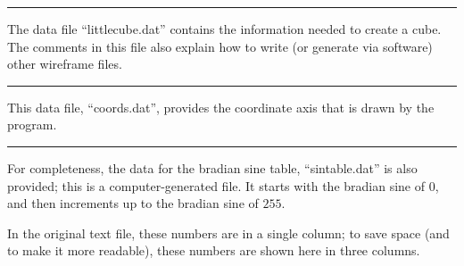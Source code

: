 \documentclass{article}
\newcommand{\sectionline}{
\begin{center}
   \rule{1in}{.01in}
\end{center}
}
\begin{document}



\sectionline

The data file ``littlecube.dat'' contains the information needed to create a cube.  The comments in this file also explain how to write (or generate via software) other wireframe files.




\sectionline

This data file, ``coords.dat'', provides the coordinate axis that is drawn by the program.




\sectionline

For completeness, the data for the bradian sine table, ``sintable.dat'' is also provided; this is a computer-generated file.  It starts with the bradian sine of $0$, and then increments up to the bradian sine of $255$.

In the original text file, these numbers are in a single column; to save space (and to make it more readable), these numbers are shown here in three columns.

\begin{multicols}{3}

\end{multicols}
\end{document}
